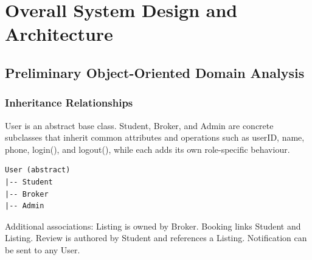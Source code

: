 \documentclass[12pt,a4paper]{article}
\begin{document}
\newpage
\section{Overall System Design and Architecture}

\subsection{Preliminary Object-Oriented Domain Analysis}

\subsubsection{Inheritance Relationships}
User is an abstract base class. Student, Broker, and Admin are concrete subclasses that inherit common attributes and operations such as userID, name, phone, login(), and logout(), while each adds its own role-specific behaviour.

\begin{verbatim}
User (abstract)
|-- Student
|-- Broker
|-- Admin
\end{verbatim}

Additional associations: Listing is owned by Broker. Booking links Student and Listing. Review is authored by Student and references a Listing. Notification can be sent to any User.
\end{document}
